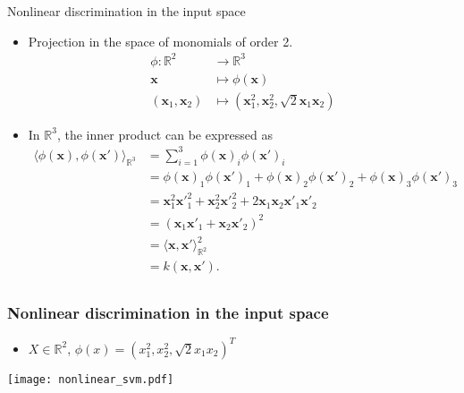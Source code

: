 \begin{frame}{Nonlinear discrimination in the input space}
  \begin{itemize}
  \item Projection in the space of monomials of order 2.
    \begin{align*}
      \phi :\mathbb{R}^2  & \to  \mathbb{R}^3\\
      \mathbf{x}          & \mapsto   \phi(\mathbf{x})\\
      (\mathbf{x}_1,\mathbf{x}_2)           & \mapsto  (\mathbf{x}_1^2,\mathbf{x}^2_2,\sqrt{2}\mathbf{x}_1\mathbf{x}_2)
    \end{align*}

  \item  In \(\mathbb{R}^3\), the inner product can be expressed as
    \begin{align*}
      \langle \phi(\mathbf{x}),\phi(\mathbf{x}')\rangle_{\mathbb{R}^3}&=   \sum_{\scriptscriptstyle i=1}^{\scriptscriptstyle 3}\phi(\mathbf{x})_i\phi(\mathbf{x}')_i \\
                                                                      &= \phi(\mathbf{x})_1\phi(\mathbf{x}')_1 + \phi(\mathbf{x})_2\phi(\mathbf{x}')_2 + \phi(\mathbf{x})_3\phi(\mathbf{x}')_3\\
                                                                      &= \mathbf{x}_1^2\mathbf{x'}_1^2 + \mathbf{x}_2^2\mathbf{x'}_2^2 + 2\mathbf{x}_1\mathbf{x}_2\mathbf{x'}_1\mathbf{x'}_2\\
                                                                      &= (\mathbf{x}_1\mathbf{x'}_1 + \mathbf{x}_2\mathbf{x'}_2)^2\\
                                                                      &= \langle \mathbf{x},\mathbf{x}'\rangle_{\mathbb{R}^2}^2\\
                                                                      &= k(\mathbf{x},\mathbf{x}').\\
      \end{align*}
      \end{itemize}

\end{frame}


\begin{frame}
  \frametitle{Nonlinear discrimination in the input space}

\begin{itemize}
 \item  $X \in \mathbb{R}^2$, $\phi(x)= (x_1^2,x_2^2,\sqrt{2}x_1 x_2)^T$
\end{itemize}

\begin{center}
\texttt{[image: nonlinear\_svm.pdf]}\\
\end{center}


\end{frame}



